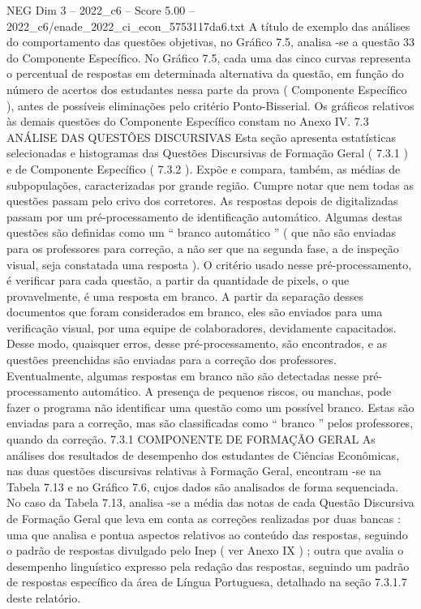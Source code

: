 \begin{textsample}{NEG Dim 3 – 2022\_c6 – Score 5.00 – 2022\_c6/enade\_2022\_ci\_econ\_5753117da6.txt}
A título de exemplo das análises do comportamento das questões objetivas, no Gráfico 7.5, analisa -se a questão 33 do Componente Específico.
No Gráfico 7.5, cada uma das cinco curvas representa o percentual de respostas em determinada alternativa da questão, em função do número de acertos dos estudantes nessa parte da prova ( Componente Específico ), antes de possíveis eliminações pelo critério Ponto-Bisserial.
Os gráficos relativos às demais questões do Componente Específico constam no Anexo IV. 7.3 ANÁLISE DAS QUESTÕES DISCURSIVAS Esta seção apresenta estatísticas selecionadas e histogramas das Questões Discursivas de Formação Geral ( 7.3.1 ) e de Componente Específico ( 7.3.2 ).
Expõe e compara, também, as médias de subpopulações, caracterizadas por grande região.
Cumpre notar que nem todas as questões passam pelo crivo dos corretores.
As respostas depois de digitalizadas passam por um pré-processamento de identificação automático.
Algumas destas questões são definidas como um “ branco automático ” ( que não são enviadas para os professores para correção, a não ser que na segunda fase, a de inspeção visual, seja constatada uma resposta ).
O critério usado nesse pré-processamento, é verificar para cada questão, a partir da quantidade de pixels, o que provavelmente, é uma resposta em branco.
A partir da separação desses documentos que foram considerados em branco, eles são enviados para uma verificação visual, por uma equipe de colaboradores, devidamente capacitados.
Desse modo, quaisquer erros, desse pré-processamento, são encontrados, e as questões preenchidas são enviadas para a correção dos professores.
Eventualmente, algumas respostas em branco não são detectadas nesse pré-processamento automático.
A presença de pequenos riscos, ou manchas, pode fazer o programa não identificar uma questão como um possível branco.
Estas são enviadas para a correção, mas são classificadas como “ branco ” pelos professores, quando da correção. 7.3.1 COMPONENTE DE FORMAÇÃO GERAL As análises dos resultados de desempenho dos estudantes de Ciências Econômicas, nas duas questões discursivas relativas à Formação Geral, encontram -se na Tabela 7.13 e no Gráfico 7.6, cujos dados são analisados de forma sequenciada.
No caso da Tabela 7.13, analisa -se a média das notas de cada Questão Discursiva de Formação Geral que leva em conta as correções realizadas por duas bancas : uma que analisa e pontua aspectos relativos ao conteúdo das respostas, seguindo o padrão de respostas divulgado pelo Inep ( ver Anexo IX ) ; outra que avalia o desempenho linguístico expresso pela redação das respostas, seguindo um padrão de respostas específico da área de Língua Portuguesa, detalhado na seção 7.3.1.7 deste relatório.

\end{textsample}
